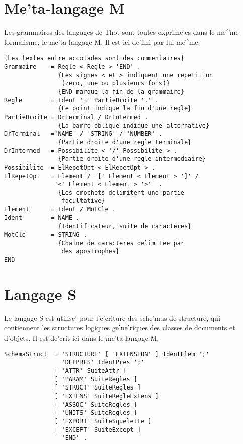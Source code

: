 {\section{Me'ta-langage M}

Les grammaires des langages de Thot sont toutes exprime'es dans
le me^me formalisme, le me'ta-langage M. Il est ici de'fini par lui-me^me.

\begin{verbatim}
{Les textes entre accolades sont des commentaires}
Grammaire    = Regle < Regle > 'END' .
               {Les signes < et > indiquent une repetition 
                (zero, une ou plusieurs fois)}
               {END marque la fin de la grammaire}
Regle        = Ident '=' PartieDroite '.' .
               {Le point indique la fin d'une regle}
PartieDroite = DrTerminal / DrIntermed .
               {La barre oblique indique une alternative}
DrTerminal   ='NAME' / 'STRING' / 'NUMBER' .
               {Partie droite d'une regle terminale}
DrIntermed   = Possibilite < '/' Possibilite > .
               {Partie droite d'une regle intermediaire}
Possibilite  = ElRepetOpt < ElRepetOpt > .
ElRepetOpt   = Element / '[' Element < Element > ']' /
              '<' Element < Element > '>'  .
               {Les crochets delimitent une partie
                facultative}
Element      = Ident / MotCle .
Ident        = NAME .
               {Identificateur, suite de caracteres}
MotCle       = STRING .
               {Chaine de caracteres delimitee par 
                des apostrophes}
END
\end{verbatim}

\section{Langage S}

Le langage S est utilise' pour l'e'criture des sche'mas de structure, qui
contiennent les structures logiques ge'ne'riques des classes de documents
et d'objets. Il est de'crit ici dans le me'ta-langage M.

\begin{verbatim}
SchemaStruct  = 'STRUCTURE' [ 'EXTENSION' ] IdentElem ';'
                'DEFPRES' IdentPres ';'
              [ 'ATTR' SuiteAttr ]
              [ 'PARAM' SuiteRegles ]
              [ 'STRUCT' SuiteRegles ]
              [ 'EXTENS' SuiteRegleExtens ]
              [ 'ASSOC' SuiteRegles ]
              [ 'UNITS' SuiteRegles ]
              [ 'EXPORT' SuiteSquelette ]
              [ 'EXCEPT' SuiteExcept ]
                'END' .


\end{verbatim}}
